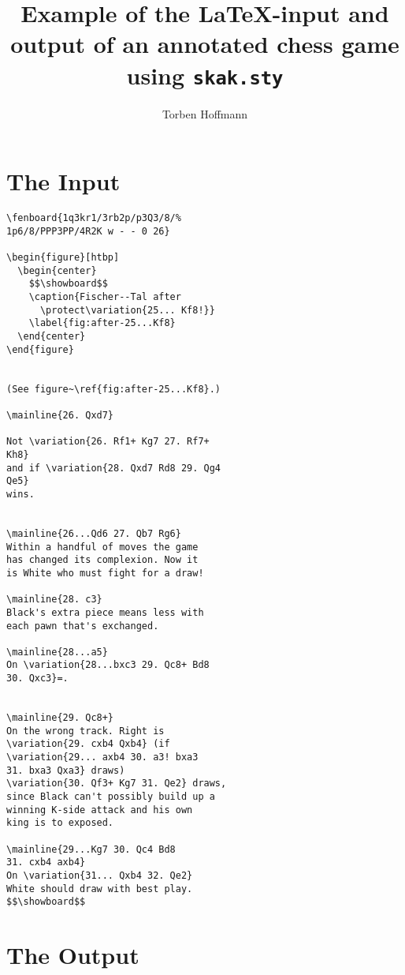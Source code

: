 \documentclass[11pt,twocolumn]{article}
\title{Example of the LaTeX-input and output of an annotated 
chess game using \texttt{skak.sty}}
\author{Torben Hoffmann}
\begin{document}
\parindent=0pt

\maketitle

\section{The Input}

\begin{verbatim}
\fenboard{1q3kr1/3rb2p/p3Q3/8/%
1p6/8/PPP3PP/4R2K w - - 0 26}

\begin{figure}[htbp]
  \begin{center}
    $$\showboard$$
    \caption{Fischer--Tal after 
      \protect\variation{25... Kf8!}}
    \label{fig:after-25...Kf8}
  \end{center}
\end{figure}


(See figure~\ref{fig:after-25...Kf8}.)

\mainline{26. Qxd7}

Not \variation{26. Rf1+ Kg7 27. Rf7+ 
Kh8}
and if \variation{28. Qxd7 Rd8 29. Qg4 
Qe5}
wins. 


\mainline{26...Qd6 27. Qb7 Rg6}
Within a handful of moves the game
has changed its complexion. Now it
is White who must fight for a draw!

\mainline{28. c3}
Black's extra piece means less with
each pawn that's exchanged.

\mainline{28...a5}
On \variation{28...bxc3 29. Qc8+ Bd8 
30. Qxc3}=.


\mainline{29. Qc8+}
On the wrong track. Right is
\variation{29. cxb4 Qxb4} (if 
\variation{29... axb4 30. a3! bxa3 
31. bxa3 Qxa3} draws) 
\variation{30. Qf3+ Kg7 31. Qe2} draws, 
since Black can't possibly build up a
winning K-side attack and his own
king is to exposed.

\mainline{29...Kg7 30. Qc4 Bd8 
31. cxb4 axb4}
On \variation{31... Qxb4 32. Qe2} 
White should draw with best play.
$$\showboard$$
\end{verbatim}

\section{The Output}

\end{document}
